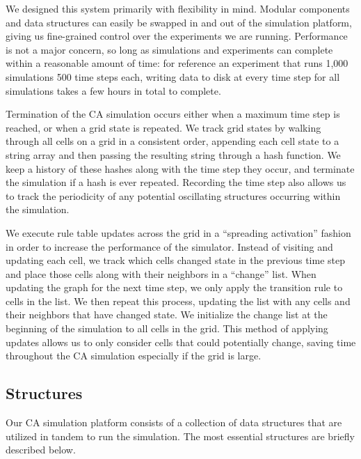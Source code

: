 \documentclass[a4paper,11pt,twoside]{report}
\begin{document}
We designed this system primarily with flexibility in mind. Modular components and data structures can easily be swapped in and out of the simulation platform, giving us fine-grained control over the experiments we are running. Performance is not a major concern, so long as simulations and experiments can complete within a reasonable amount of time: for reference an experiment that runs 1,000 simulations 500 time steps each, writing data to disk at every time step for all simulations takes a few hours in total to complete.


Termination of the CA simulation occurs either when a maximum time step is reached, or when a grid state is repeated. We track grid states by walking through all cells on a grid in a consistent order, appending each cell state to a string array and then passing the resulting string through a hash function. We keep a history of these hashes along with the time step they occur, and terminate the simulation if a hash is ever repeated. Recording the time step also allows us to track the periodicity of any potential oscillating structures occurring within the simulation.

We execute rule table updates across the grid in a ``spreading activation'' fashion in order to increase the performance of the simulator. Instead of visiting and updating each cell, we track which cells changed state in the previous time step and place those cells along with their neighbors in a ``change'' list. When updating the graph for the next time step, we only apply the transition rule to cells in the list. We then repeat this process, updating the list with any cells and their neighbors that have changed state. We initialize the change list at the beginning of the simulation to all cells in the grid. This method of applying updates allows us to only consider cells that could potentially change, saving time throughout the CA simulation especially if the grid is large. 

\subsection{Structures}
Our CA simulation platform consists of a collection of data structures that are utilized in tandem to run the simulation. The most essential structures are briefly described below.
\end{document}
